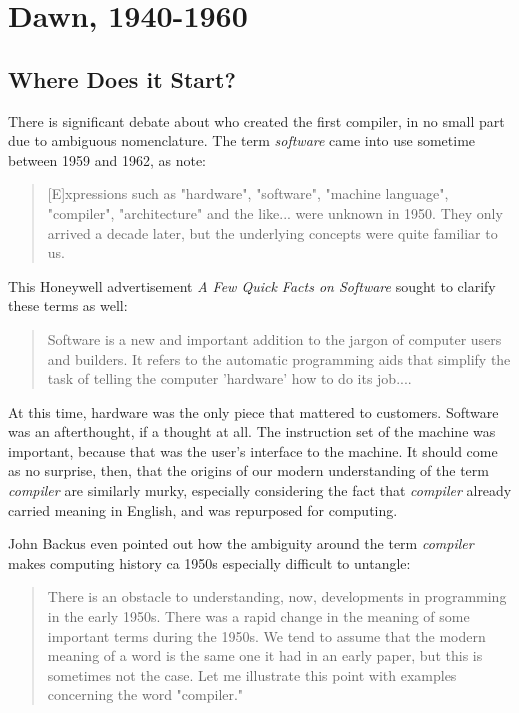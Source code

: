 \chapter{Dawn, 1940-1960}

\section{Where Does it Start?}

There is significant debate about who created the first compiler,
in no small part due to ambiguous nomenclature.
The term \textit{software} came into use sometime between 1959 and 1962,
as \citeauthor{the-first-computers-2002} note:

\begin{quotation}
[E]xpressions such as "hardware", "software", "machine language", "compiler",
"architecture" and the like... were unknown in 1950. They only arrived a decade
later, but the underlying concepts were quite familiar to us.
\cite{the-first-computers-2002}
\end{quotation}

This Honeywell advertisement \textit{A Few Quick Facts on Software} sought to clarify these terms as well:

\begin{quotation}
Software is a new and important addition to the jargon of computer users and builders.
It refers to the automatic programming aids that simplify the task of telling the computer 'hardware' how to do its job....
\end{quotation}

At this time, hardware was the only piece that mattered to customers.
Software was an afterthought, if a thought at all.
The instruction set of the machine was important, because that was the
user's interface to the machine.
It should come as no surprise, then, that the origins of our modern understanding of the
term \textit{compiler} are similarly murky, especially considering the fact that
\textit{compiler} already carried meaning in English, and was repurposed for computing.

John Backus even pointed out how the ambiguity around the term \textit{compiler}
makes computing history ca 1950s especially difficult to untangle:
\begin{quotation}
    There is an obstacle to understanding, now, developments in programming in 
the early 1950s. There was a rapid change in the meaning of some important 
terms during the 1950s. We tend to assume that the modern meaning of a word is 
the same one it had in an early paper, but this is sometimes not the case. Let 
me illustrate this point with examples concerning the word "compiler."
\cite{Backus_1980_Programming_in_America_in_1950s}
\end{quotation}

